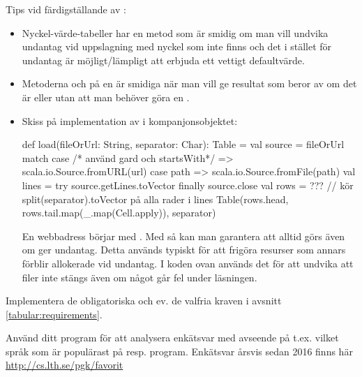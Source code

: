\noindent Tips vid färdigställande av :
\begin{itemize}[leftmargin=*]
  \item Nyckel-värde-tabeller har en metod  som är smidig om man vill undvika undantag vid uppslagning med nyckel som inte finns och det i stället för undantag är möjligt/lämpligt att erbjuda ett vettigt defaultvärde.
  \item Metoderna  och  på en  är smidiga när man vill ge resultat som beror av om det är  eller  utan att man behöver göra en .
\item Skiss på implementation av  i kompanjonsobjektet:
\begin{CodeSmall}
def load(fileOrUrl: String, separator: Char): Table = {
  val source = fileOrUrl match {
    case /* använd gard och startsWith*/ => scala.io.Source.fromURL(url)
    case path  => scala.io.Source.fromFile(path)
  }
  val lines = try source.getLines.toVector finally source.close
  val rows = ??? // kör split(separator).toVector på alla rader i lines
  Table(rows.head, rows.tail.map(_.map(Cell.apply)), separator)
}
\end{CodeSmall}
En webbadress börjar med .
Med  så kan man garantera att  alltid görs även om  ger undantag. Detta används typiskt för att frigöra resurser som annars förblir allokerade vid undantag. I koden ovan används det för att undvika att filer inte stängs även om något går fel under läsningen.
\end{itemize}

\Task Implementera de obligatoriska och ev. de valfria kraven i avsnitt \ref{tabular:requirements}.

\Task Använd ditt program för att analysera enkätsvar med avseende på t.ex. vilket språk som är populärast på resp. program. Enkätsvar årsvis sedan 2016 finns här \url{http://cs.lth.se/pgk/favorit}

